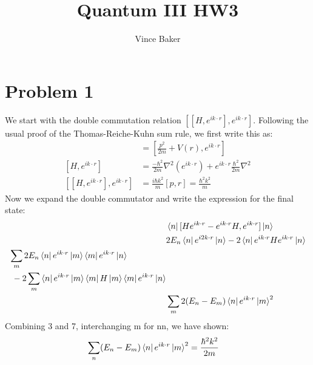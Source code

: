\documentclass[a4paper,11pt]{article}
\title{Quantum III HW3}
\author{Vince Baker}
\numberwithin{equation}{section}
\begin{document}
\maketitle

\section{Problem 1}
We start with the double commutation relation $[[H,e^{ik\cdot r}],e^{ik\cdot r}]$. 
Following the usual proof of the Thomas-Reiche-Kuhn sum rule, we first write this as:
\begin{align}
 [H,e^{ik\cdot r}] &=  [\frac{p^2}{2m}+V(r),e^{ik\cdot r}]\\
 [H,e^{ik\cdot r}] &= \frac{-\hbar^2}{2m}\nabla^2(e^{ik\cdot r})+e^{ik\cdot r}\frac{\hbar^2}{2m}\nabla^2\\
 [[H,e^{ik\cdot r}],e^{ik\cdot r}] &= \frac{i\hbar k^2}{m}[p, r] = \frac{\hbar^2k^2}{m}
\end{align}
Now we expand the double commutator and write the expression for the final state:
\begin{align}
 &\bra{n}[He^{ik\cdot r}-e^{ik\cdot r}H,e^{ik\cdot r}]\ket{n}\\
 &2E_n\bra{n}e^{i2k\cdot r}\ket{n}-2\bra{n}e^{ik\cdot r}He^{ik\cdot r} \ket{n}\\
 \begin{split}
 &\sum_m 2E_n\bra{n}e^{ik\cdot r}\ket{m}\bra{m}e^{ik\cdot r}\ket{n}\\&\ -2\sum_m\bra{n}e^{ik\cdot r}\ket{m}\bra{m}H\ket{m}\bra{m}e^{ik\cdot r}\ket{n}
 \end{split}\\
 &\sum_m 2(E_n-E_m)\bra{n}e^{ik\cdot r}\ket{m}^2
\end{align}
Combining 3 and 7, interchanging m for nn, we have shown:
\begin{align}
 \sum_n (E_n-E_m)\bra{n}e^{ik\cdot r}\ket{m}^2 &= \frac{\hbar^2k^2}{2m}
\end{align}
\end{document}
